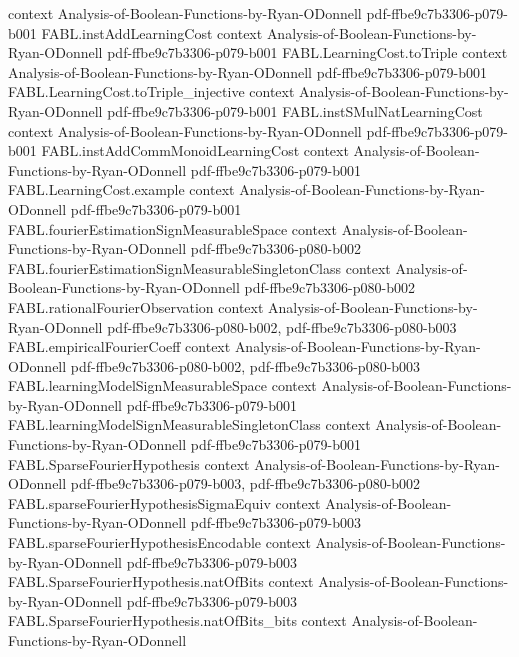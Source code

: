 \begin{theorem}
  {context}
  {Analysis-of-Boolean-Functions-by-Ryan-ODonnell}
  {pdf-ffbe9c7b3306-p079-b001}
\proofstep
  {FABL.instAddLearningCost}
  {context}
  {Analysis-of-Boolean-Functions-by-Ryan-ODonnell}
  {pdf-ffbe9c7b3306-p079-b001}
\proofstep
  {FABL.LearningCost.toTriple}
  {context}
  {Analysis-of-Boolean-Functions-by-Ryan-ODonnell}
  {pdf-ffbe9c7b3306-p079-b001}
\proofstep
  {FABL.LearningCost.toTriple_injective}
  {context}
  {Analysis-of-Boolean-Functions-by-Ryan-ODonnell}
  {pdf-ffbe9c7b3306-p079-b001}
\proofstep
  {FABL.instSMulNatLearningCost}
  {context}
  {Analysis-of-Boolean-Functions-by-Ryan-ODonnell}
  {pdf-ffbe9c7b3306-p079-b001}
\proofstep
  {FABL.instAddCommMonoidLearningCost}
  {context}
  {Analysis-of-Boolean-Functions-by-Ryan-ODonnell}
  {pdf-ffbe9c7b3306-p079-b001}
\proofstep
  {FABL.LearningCost.example}
  {context}
  {Analysis-of-Boolean-Functions-by-Ryan-ODonnell}
  {pdf-ffbe9c7b3306-p079-b001}
\proofstep
  {FABL.fourierEstimationSignMeasurableSpace}
  {context}
  {Analysis-of-Boolean-Functions-by-Ryan-ODonnell}
  {pdf-ffbe9c7b3306-p080-b002}
\proofstep
  {FABL.fourierEstimationSignMeasurableSingletonClass}
  {context}
  {Analysis-of-Boolean-Functions-by-Ryan-ODonnell}
  {pdf-ffbe9c7b3306-p080-b002}
\proofstep
  {FABL.rationalFourierObservation}
  {context}
  {Analysis-of-Boolean-Functions-by-Ryan-ODonnell}
  {pdf-ffbe9c7b3306-p080-b002,
    pdf-ffbe9c7b3306-p080-b003}
\proofstep
  {FABL.empiricalFourierCoeff}
  {context}
  {Analysis-of-Boolean-Functions-by-Ryan-ODonnell}
  {pdf-ffbe9c7b3306-p080-b002,
    pdf-ffbe9c7b3306-p080-b003}
\proofstep
  {FABL.learningModelSignMeasurableSpace}
  {context}
  {Analysis-of-Boolean-Functions-by-Ryan-ODonnell}
  {pdf-ffbe9c7b3306-p079-b001}
\proofstep
  {FABL.learningModelSignMeasurableSingletonClass}
  {context}
  {Analysis-of-Boolean-Functions-by-Ryan-ODonnell}
  {pdf-ffbe9c7b3306-p079-b001}
\proofstep
  {FABL.SparseFourierHypothesis}
  {context}
  {Analysis-of-Boolean-Functions-by-Ryan-ODonnell}
  {pdf-ffbe9c7b3306-p079-b003,
    pdf-ffbe9c7b3306-p080-b002}
\proofstep
  {FABL.sparseFourierHypothesisSigmaEquiv}
  {context}
  {Analysis-of-Boolean-Functions-by-Ryan-ODonnell}
  {pdf-ffbe9c7b3306-p079-b003}
\proofstep
  {FABL.sparseFourierHypothesisEncodable}
  {context}
  {Analysis-of-Boolean-Functions-by-Ryan-ODonnell}
  {pdf-ffbe9c7b3306-p079-b003}
\proofstep
  {FABL.SparseFourierHypothesis.natOfBits}
  {context}
  {Analysis-of-Boolean-Functions-by-Ryan-ODonnell}
  {pdf-ffbe9c7b3306-p079-b003}
\proofstep
  {FABL.SparseFourierHypothesis.natOfBits_bits}
  {context}
  {Analysis-of-Boolean-Functions-by-Ryan-ODonnell}

\end{theorem}
